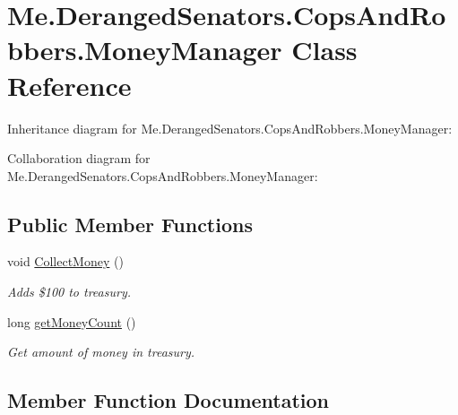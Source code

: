 \hypertarget{classMe_1_1DerangedSenators_1_1CopsAndRobbers_1_1MoneyManager}{}\section{Me.\+Deranged\+Senators.\+Cops\+And\+Robbers.\+Money\+Manager Class Reference}
\label{classMe_1_1DerangedSenators_1_1CopsAndRobbers_1_1MoneyManager}


Inheritance diagram for Me.\+Deranged\+Senators.\+Cops\+And\+Robbers.\+Money\+Manager\+:


Collaboration diagram for Me.\+Deranged\+Senators.\+Cops\+And\+Robbers.\+Money\+Manager\+:
\subsection*{Public Member Functions}
\begin{DoxyCompactItemize}
\item 
void \hyperlink{classMe_1_1DerangedSenators_1_1CopsAndRobbers_1_1MoneyManager_a5919f25d94fc666154c56a5be8f83aba}{Collect\+Money} ()
\begin{DoxyCompactList}\small\item\em Adds \$100 to treasury. \end{DoxyCompactList}\item 
long \hyperlink{classMe_1_1DerangedSenators_1_1CopsAndRobbers_1_1MoneyManager_ae3add7d4d516daeed1a95f866e116b45}{get\+Money\+Count} ()
\begin{DoxyCompactList}\small\item\em Get amount of money in treasury. \end{DoxyCompactList}\end{DoxyCompactItemize}


\subsection{Member Function Documentation}
\mbox{\label{classMe_1_1DerangedSenators_1_1CopsAndRobbers_1_1MoneyManager_a5919f25d94fc666154c56a5be8f83aba}} 
